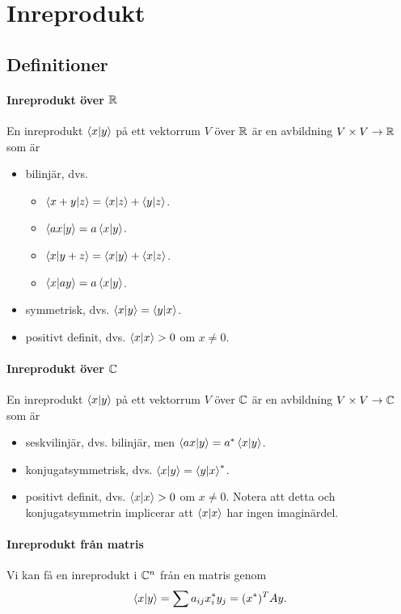 \section{Inreprodukt}

\subsection{Definitioner}

\paragraph{Inreprodukt över $\mathbb{R}$}
En inreprodukt $\bra{x}\ket{y}$ på ett vektorrum $V$ över $\mathbb{R}$ är en avbildning $V\times V\to \mathbb{R}$ som är
\begin{itemize}
	\item bilinjär, dvs.
	\begin{itemize}
		\item $\bra{x + y}\ket{z} = \bra{x}\ket{z} + \bra{y}\ket{z}$.
		\item $\bra{ax}\ket{y} = a\bra{x}\ket{y}$.
		\item $\bra{x}\ket{y + z} = \bra{x}\ket{y} + \bra{x}\ket{z}$.
		\item $\bra{x}\ket{ay} = a\bra{x}\ket{y}$.
	\end{itemize}
	\item symmetrisk, dvs. $\bra{x}\ket{y} = \bra{y}\ket{x}$.
	\item positivt definit, dvs. $\bra{x}\ket{x} > 0$ om $x \neq 0$.
\end{itemize}

\paragraph{Inreprodukt över $\mathbb{C}$}
En inreprodukt $\bra{x}\ket{y}$ på ett vektorrum $V$ över $\mathbb{C}$ är en avbildning $V\times V\to \mathbb{C}$ som är
\begin{itemize}
	\item seskvilinjär, dvs. bilinjär, men $\bra{ax}\ket{y} = a^{*}\bra{x}\ket{y}$.
	\item konjugatsymmetrisk, dvs. $\bra{x}\ket{y} = \bra{y}\ket{x}^{*}$.
	\item positivt definit, dvs. $\bra{x}\ket{x} > 0$ om $x \neq 0$. Notera att detta och konjugatsymmetrin implicerar att $\bra{x}\ket{x}$ har ingen imaginärdel.
\end{itemize}

\paragraph{Inreprodukt från matris}
Vi kan få en inreprodukt i $\mathbb{C}^{n}$ från en matris genom
\begin{align*}
	\bra{x}\ket{y} = \sum a_{ij}x_{i}^{*}{y_{j}} = (x^{*})^{T}Ay.
\end{align*}

